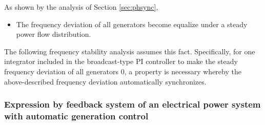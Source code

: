 \documentclass[tombow,dvipdfmx]{corona-a5-1.1}
\begin{document}
As shown by the analysis of Section \ref{sec:phsync},
\begin{itemize}
\item The frequency deviation of all generators become equalize under a steady power flow distribution.
\end{itemize}
The following frequency stability analysis assumes this fact.
Specifically, for one integrator included in the broadcast-type PI controller to make the steady frequency deviation of all generators 0, a property is necessary whereby the above-described frequency deviation automatically synchronizes.

\smallskip
\subsubsection{Expression by feedback system of an electrical power system with automatic generation control}
\end{document}
